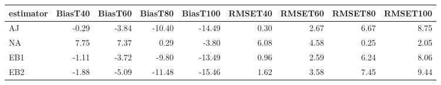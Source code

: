 \begin{table}[ht]
\centering
\begin{tabular}{lrrrrrrrr}
  \toprule
estimator & BiasT40 & BiasT60 & BiasT80 & BiasT100 & RMSET40 & RMSET60 & RMSET80 & RMSET100 \\ 
  \midrule
AJ & -0.29 & -3.84 & -10.40 & -14.49 & 0.30 & 2.67 & 6.67 & 8.75 \\ 
  NA & 7.75 & 7.37 & 0.29 & -3.80 & 6.08 & 4.58 & 0.25 & 2.05 \\ 
  EB1 & -1.11 & -3.72 & -9.80 & -13.49 & 0.96 & 2.59 & 6.24 & 8.06 \\ 
  EB2 & -1.88 & -5.09 & -11.48 & -15.46 & 1.62 & 3.58 & 7.45 & 9.44 \\ 
   \bottomrule
\end{tabular}
\end{table}
